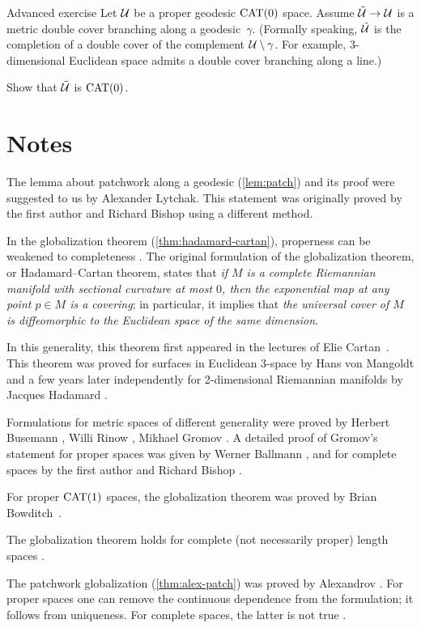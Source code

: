 \begin{thm}{Advanced exercise}\label{ex:branching-cover} 
Let $\mathcal{U}$ be a proper geodesic $\mathrm{CAT}(0)$ space.
Assume $\tilde{\mathcal{U}}\to \mathcal{U}$ is a metric double cover branching along a geodesic~$\gamma$.
(Formally speaking, $\tilde{\mathcal{U}}$ is the completion of a double cover of the complement $\mathcal{U}\setminus \gamma$.
For example, 3-dimensional Euclidean space admits a double cover branching along a line.)

Show that $\tilde{\mathcal{U}}$ is $\mathrm{CAT}(0)$.
\end{thm}

\section{Notes}

The lemma about patchwork along a geodesic (\ref{lem:patch}) and its proof were suggested to us by Alexander Lytchak.  
This statement was originally proved by the first author and Richard Bishop \cite{alexander-bishop-1990} using a different method.

In the globalization theorem (\ref{thm:hadamard-cartan}), properness can be weakened to completeness \cite[see][and the references therein]{alexander-kapovitch-petrunin-2025}.
The original formulation of the globalization theorem, or 
Hadamard--Cartan theorem, states that \textit{if $M$ is a complete Riemannian manifold with sectional curvature at most $0$,  
then the exponential map at any point $p\in M$ is a covering};
in particular, it implies that \textit{the universal cover of $M$ is diffeomorphic to the Euclidean space of the same dimension}.

In this generality, this theorem first appeared in the lectures of Elie Cartan~\cite{cartan}.
This theorem was proved for surfaces in Euclidean $3$-space 
by Hans von Mangoldt \cite{mangoldt}
and a few years later independently for 2-dimensional Riemannian manifolds by Jacques Hadamard \cite{hadamard}.

Formulations for metric spaces of different generality were proved by 
Herbert Busemann \cite{busemann-CBA},
Willi Rinow \cite{rinow},
Mikhael Gromov \cite[p.~119]{gromov-1987}. 
A detailed proof of Gromov's statement for proper spaces was given by Werner Ballmann \cite{ballmann-1995},
and for complete spaces by the first author and Richard Bishop \cite{alexander-bishop-1990}.

For proper $\mathrm{CAT}(1)$ spaces, the globalization theorem was proved by Brian Bowditch~\cite{bowditch-1995}.

{\sloppy

The globalization theorem holds for complete (not necessarily proper)  length spaces \cite{alexander-kapovitch-petrunin-2025}.

}

The patchwork globalization (\ref{thm:alex-patch}) was proved by Alexandrov \cite[Satz 9]{alexandrov-1957}.
For proper spaces one can remove the continuous dependence from the formulation; it follows from uniqueness.
For complete spaces, the latter is not true \cite[Chapter I, Exercise 3.14]{bridson-haefliger}.
